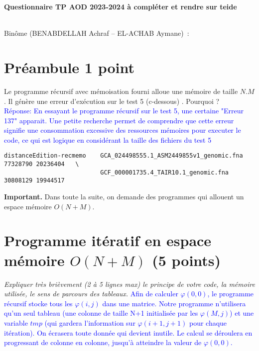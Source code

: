 \documentclass[10pt,a4paper]{article}
\begin{document}
\thispagestyle{empty}

\noindent\centerline{\bf\large Questionnaire  TP AOD 2023-2024 à compléter et rendre sur teide  } \\
Binôme 
(BENABDELLAH   Achraf --
 EL-ACHAB      Aymane)
\,: \dotfill

\section{Préambule 1 point}
Le programme récursif avec mémoisation fourni alloue une mémoire de taille $N.M$.
Il génère une erreur d'exécution sur le test 5 (c-dessous) . Pourquoi ? \\
\textcolor{blue}{ Réponse:  En essayant le programme récursif sur le test 5, une certaine "Erreur 137" apparait. Une petite recherche permet de comprendre que cette erreur signifie une consommation excessive des ressources mémoires pour executer le code, ce qui est logique en considérant la taille des fichiers du test 5}

\begin{verbatim}
distanceEdition-recmemo    GCA_024498555.1_ASM2449855v1_genomic.fna 77328790 20236404   \
                           GCF_000001735.4_TAIR10.1_genomic.fna 30808129 19944517 
\end{verbatim}

{\noindent\bf{Important}.} Dans toute la suite, on demande des programmes qui allouent un espace mémoire $O(N+M)$.

\section{Programme itératif en espace mémoire $O(N+M)$ (5 points)}
{\em Expliquer très brièvement (2 à 5 lignes max) le principe de votre code, la mémoire utilisée, le sens de parcours des tableaux.}
\textcolor{blue}{
Afin de calculer $\varphi (0,0)$, le programme récursif stocke tous les $\varphi (i,j)$ dans une matrice. 
Notre programme n'utilisera qu'un seul tableau (une colonne de taille N+1 initialisée par les $\varphi (M,j)$) et une variable $tmp$ (qui gardera l'information sur $\varphi (i+1,j+1)$ pour chaque itération). On écrasera toute donnée qui devient inutile.
Le calcul se déroulera en progressant de colonne en colonne, jusqu'à atteindre la valeur de $\varphi (0,0)$.
}
\end{document}
